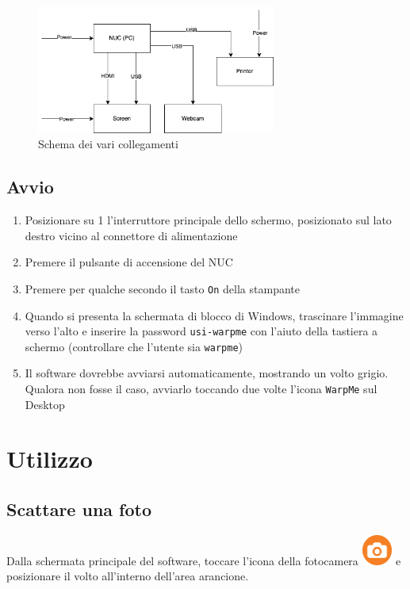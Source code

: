 \documentclass[12pt]{article}
\begin{document}
		\begin{figure}[H]
                \centering
                \includegraphics[width=0.7\textwidth]{img/cables.png}
                \caption{Schema dei vari collegamenti}
                \label{cables}
        \end{figure}
		
		
	\subsection{Avvio}
	
	\begin{enumerate}		
		\item Posizionare su 1 l'interruttore principale dello schermo, posizionato sul lato destro vicino al connettore di alimentazione
		\item Premere il pulsante di accensione del NUC
		\item Premere per qualche secondo il tasto \texttt{On} della stampante
		\item Quando si presenta la schermata di blocco di Windows, trascinare l'immagine verso l'alto e inserire la password \texttt{usi-warpme} con l'aiuto della tastiera a schermo (controllare che l'utente sia \texttt{warpme})
		\item Il software dovrebbe avviarsi automaticamente, mostrando un volto grigio. Qualora non fosse il caso, avviarlo toccando due volte l'icona \texttt{WarpMe} sul Desktop
	\end{enumerate}	
		
		
		
\section{Utilizzo}

	\subsection{Scattare una foto}

		Dalla schermata principale del software, toccare l'icona della fotocamera \includegraphics[width=1cm]{../src/resource/icons/camera.png} e posizionare il volto all'interno dell'area arancione.
		
\end{document}
